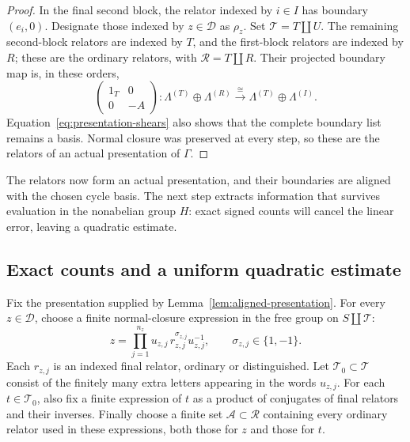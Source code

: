\begin{proof}
In the final second block, the relator indexed by $i\in I$ has boundary
$(e_i,0)$.  Designate those indexed by $z\in\mathcal D$ as $\rho_z$.
Set $\mathcal T=T\amalg U$.  The remaining second-block relators are
indexed by $T$, and the first-block relators are indexed by $R$; these
are the ordinary relators, with $\mathcal R=T\amalg R$.  Their projected
boundary map is, in these orders,
\begin{equation}\label{eq:ordinary-diagonal}
 \begin{pmatrix}1_T&0\\0&-A\end{pmatrix}:
 \Lambda^{(T)}\oplus\Lambda^{(R)}
 \xrightarrow{\ \cong\ }
 \Lambda^{(T)}\oplus\Lambda^{(I)}.
\end{equation}
Equation~\eqref{eq:presentation-shears} also shows that the complete
boundary list remains a basis.  Normal closure was preserved at every
step, so these are the relators of an actual presentation of $\Gamma$.
\end{proof}

The relators now form an actual presentation, and their boundaries are
aligned with the chosen cycle basis. The next step extracts information
that survives evaluation in the nonabelian group $H$: exact signed
counts will cancel the linear error, leaving a quadratic estimate.

\subsection{Exact counts and a uniform quadratic estimate}

Fix the presentation supplied by Lemma~\ref{lem:aligned-presentation}.
For every $z\in\mathcal D$, choose a finite normal-closure expression
in the free group on $S\amalg\mathcal T$:
\begin{equation}\label{eq:relator-expression}
 z=\prod_{j=1}^{n_z}u_{z,j}\,r_{z,j}^{\sigma_{z,j}}u_{z,j}^{-1},
 \qquad \sigma_{z,j}\in\{1,-1\}.
\end{equation}
Each $r_{z,j}$ is an indexed final relator, ordinary or distinguished.
Let $\mathcal T_0\subset\mathcal T$ consist of the finitely many extra letters
appearing in the words $u_{z,j}$.  For each $t\in\mathcal T_0$, also fix a finite
expression of $t$ as a product of conjugates of final relators and their
inverses.  Finally choose a finite set $\mathcal A\subset\mathcal R$
containing every ordinary relator used in these expressions, both
those for $z$ and those for $t$.

